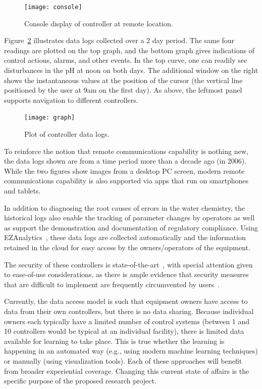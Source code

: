 \begin{figure}[t]
 \center
\texttt{[image: console]}
    \caption{Console display of controller at remote location.}
    \label{console}
\end{figure}

Figure~\ref{graph} illustrates data logs collected over a 2 day period.
The same four readings are plotted on the top graph, and the bottom
graph gives indications of control actions, alarms, and other events.
In the top curve, one can readily see disturbances in the pH at noon
on both days.
The additional window on the right shows the instantaneous values
at the position of the cursor (the vertical line positioned
by the user at 9am on the first day).
As above, the leftmost panel supports navigation to different
controllers.

\begin{figure}[t]
 \center
\texttt{[image: graph]}
    \caption{Plot of controller data logs.}
    \label{graph}
\end{figure}

To reinforce the notion that remote communications capability is
nothing new, the data logs shown are from a time period more than a
decade ago (in 2006).
While the two figures show images from a desktop PC screen, modern
remote communications capability is also supported via apps that
run on smartphones and tablets.

In addition to diagnosing the root causes of errors in the water
chemistry, the historical logs also enable the tracking of
parameter changes by operators as well as support the demonstration
and documentation of regulatory compliance.
Using EZAnalytics\texttrademark{}~\cite{ccgss17}, these data logs
are collected automatically and the information retained in the
cloud for easy access by the owners/operators of the equipment.

The security of these controllers is
state-of-the-art~\cite{ccgss16,ccgss18}, with special attention given
to ease-of-use considerations, as there is ample evidence that
security measures that are difficult to implement are frequently
circumvented by users~\cite{gefen2000relative,hertzum2004usable,schneier16}.

Currently, the data access model is such that equipment owners have
access to data from their own controllers, but there is no data sharing.
Because individual owners each typically have a limited number of
control systems (between 1 and 10 controllers would be typical at an
individual facility), there is limited data available for
learning to take place.  This is true whether the learning is
happening in an automated way (e.g., using modern
machine learning techniques) or manually (using visualization tools).
Each of these approaches will benefit from broader experiential coverage.
Changing this current state of affairs is the specific purpose of the
proposed research project.

